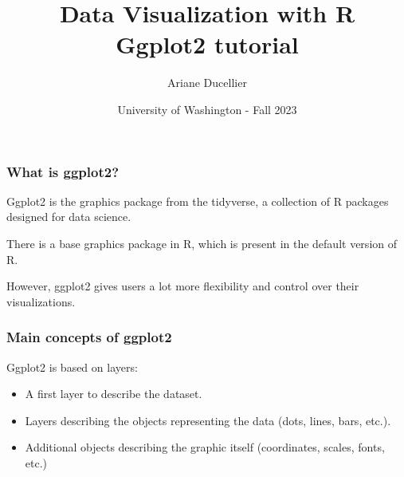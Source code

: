 \documentclass{beamer}
\title[Data Visualization with R - Ggplot2 tutorial]{Data Visualization with R \\ Ggplot2 tutorial}
\author{Ariane Ducellier}
\date{University of Washington - Fall 2023}
\begin{document}
	\begin{frame}
		\titlepage
	\end{frame}

	\begin{frame}
		\frametitle{What is ggplot2?}

		Ggplot2 is the graphics package from the tidyverse, a collection of R packages designed for data science. 

		\vspace{2em}

		There is a base graphics package in R, which is present in the default version of R.

		\vspace{2em}

		However, ggplot2 gives users a lot more flexibility and control over their visualizations.
		
	\end{frame}

	\begin{frame}
		\frametitle{Main concepts of ggplot2}

		Ggplot2 is based on layers:

		\vspace{2em}
		
		\begin{itemize}
		\setlength{\itemsep}{1em}
			\item A first layer to describe the dataset.
			\item Layers describing the objects representing the data (dots, lines, bars, etc.).
			\item Additional objects describing the graphic itself (coordinates, scales, fonts, etc.)
		\end{itemize}

	\end{frame}
\end{document}
